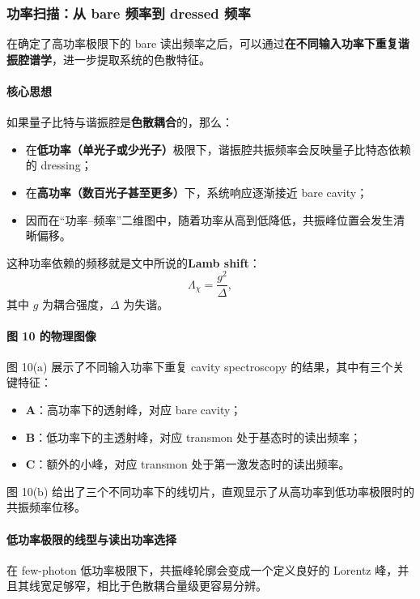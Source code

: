 \documentclass[12pt,a4paper,oneside]{ctexbook}
\begin{document}
\subsubsection{功率扫描：从 bare 频率到 dressed 频率}

在确定了高功率极限下的 bare 读出频率之后，可以通过\textbf{在不同输入功率下重复谐振腔谱学}，进一步提取系统的色散特征。

\paragraph{核心思想}
如果量子比特与谐振腔是\textbf{色散耦合}的，那么：
\begin{itemize}
    \item 在\textbf{低功率（单光子或少光子）}极限下，谐振腔共振频率会反映量子比特态依赖的 dressing；
    \item 在\textbf{高功率（数百光子甚至更多）}下，系统响应逐渐接近 bare cavity；
    \item 因而在“功率--频率”二维图中，随着功率从高到低降低，共振峰位置会发生清晰偏移。
\end{itemize}

这种功率依赖的频移就是文中所说的\textbf{Lamb shift}：
\[
\Lambda_\chi = \frac{g^2}{\Delta},
\]
其中 \(g\) 为耦合强度，\(\Delta\) 为失谐。

\paragraph{图 10 的物理图像}
图 10(a) 展示了不同输入功率下重复 cavity spectroscopy 的结果，其中有三个关键特征：
\begin{itemize}
    \item \textbf{A}：高功率下的透射峰，对应 bare cavity；
    \item \textbf{B}：低功率下的主透射峰，对应 transmon 处于基态时的读出频率；
    \item \textbf{C}：额外的小峰，对应 transmon 处于第一激发态时的读出频率。
\end{itemize}

图 10(b) 给出了三个不同功率下的线切片，直观显示了从高功率到低功率极限时的共振频率位移。

\paragraph{低功率极限的线型与读出功率选择}
在 few-photon 低功率极限下，共振峰轮廓会变成一个定义良好的 Lorentz 峰，并且其线宽足够窄，相比于色散耦合量级更容易分辨。
\end{document}

